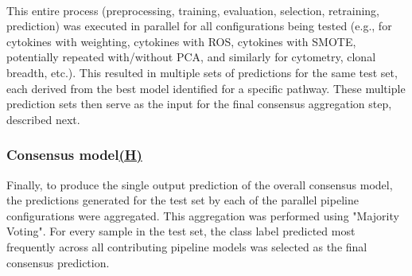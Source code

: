 \documentclass[12pt,a4paper]{report}
\begin{document}
\\
This entire process (preprocessing, training, evaluation, selection, retraining, prediction) was executed in parallel for all configurations being tested (e.g., for cytokines with weighting, cytokines with ROS, cytokines with SMOTE, potentially repeated with/without PCA, and similarly for cytometry, clonal breadth, etc.). This resulted in multiple sets of predictions for the same test set, each derived from the best model identified for a specific pathway. These multiple prediction sets then serve as the input for the final consensus aggregation step, described next.

\subsubsection*{Consensus model\hyperref[fig:pipeline-1]{(H)}}
Finally, to produce the single output prediction of the overall consensus model, the predictions generated for the test set by each of the parallel pipeline configurations were aggregated. This aggregation was performed using "Majority Voting". For every sample in the test set, the class label predicted most frequently across all contributing pipeline models was selected as the final consensus prediction.
\end{document}

